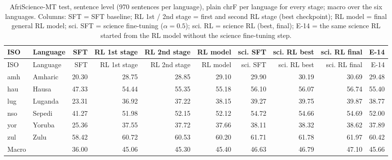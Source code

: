 {\scriptsize\setlength{\tabcolsep}{1.5pt}
\begin{longtable}{@{}llrrrrrrrr@{}}
\caption{AfriScience-MT test, sentence level (970 sentences per language), plain chrF per language for every stage; macro over the six languages. Columns: SFT = SFT baseline; RL 1st / 2nd stage = first and second RL stage (best checkpoint); RL model = final general RL model; sci. SFT = science fine-tuning ($\alpha=0.5$); sci. RL = science RL (best, final); E-14 = the same science RL started from the RL model without the science fine-tuning step.}\label{tab:sci-chrf}\\
\toprule
ISO & Language & SFT & RL 1st stage & RL 2nd stage & RL model & sci. SFT & sci. RL best & sci. RL final & E-14 \\
\midrule\endfirsthead
\toprule
ISO & Language & SFT & RL 1st stage & RL 2nd stage & RL model & sci. SFT & sci. RL best & sci. RL final & E-14 \\
\midrule\endhead
\midrule\endfoot
\bottomrule\endlastfoot
amh & Amharic & 20.30 & 28.75 & 28.85 & 29.10 & 29.90 & 30.19 & 30.69 & 29.48 \\
hau & Hausa & 47.33 & 54.44 & 55.35 & 55.18 & 56.10 & 56.07 & 56.74 & 55.40 \\
lug & Luganda & 23.31 & 36.92 & 37.22 & 38.15 & 39.27 & 39.75 & 39.87 & 38.77 \\
nso & Sepedi & 41.27 & 51.98 & 52.15 & 52.12 & 54.72 & 54.66 & 54.69 & 52.00 \\
yor & Yoruba & 25.36 & 37.55 & 37.72 & 37.66 & 38.11 & 38.32 & 38.62 & 37.89 \\
zul & Zulu & 58.42 & 60.72 & 60.53 & 60.20 & 61.71 & 61.78 & 61.97 & 60.42 \\
\midrule Macro &  & 36.00 & 45.06 & 45.30 & 45.40 & 46.63 & 46.79 & 47.10 & 45.66 \\
\end{longtable}}
